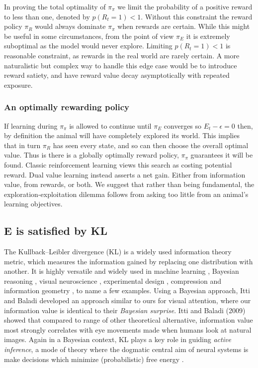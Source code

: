 \documentclass[9pt,twocolumn,twoside]{pnas-new}
\begin{document}
In proving the total optimality of $\pi_{\pi}$ we limit the probability of a positive reward to less than one, denoted by $p(R_t = 1) < 1$. Without this constraint the reward policy $\pi_R$ would always dominate $\pi_{\pi}$ when rewards are certain. While this might be useful in some circumstances, from the point of view $\pi_E$ it is extremely suboptimal as the model would never explore. Limiting $p(R_t = 1) < 1$ is reasonable constraint, as rewards in the real world are rarely certain. A more naturalistic but complex way to handle this edge case would be to introduce reward satiety, and have reward value decay asymptotically with repeated exposure. 


\subsubsection*{An optimally rewarding policy}
If learning during $\pi_{\pi}$ is allowed to continue until $\pi_E$ converges so $E_t - \epsilon = 0$ then, by definition the animal will have completely explored its world. This implies that in turn $\pi_R$ has seen every state, and so can then choose the overall optimal value. Thus is there is a globally optimally reward policy, $\pi_{\pi}$ guarantees it will be found. Classic reinforcement learning views this search as costing potential reward. Dual value learning instead asserts a net gain. Either from information value, from rewards, or both. We suggest that rather than being fundamental, the exploration-exploitation dilemma follows from asking too little from an animal's learning objectives.

\subsection*{E is satisfied by KL}
The Kullback--Leibler divergence (KL) is a widely used information theory metric, which measures the information gained by replacing one distribution with another. It is highly versatile and widely used in machine learning \cite{Goodfellow-et-al-2016}, Bayesian reasoning \cite{Itti2009,Friston2016}, visual neuroscience \cite{Itti2009}, experimental design \cite{Lopez-Fidalgo2007}, compression \cite{Mackay,Still2012} and information geometry \cite{Ay2015}, to name a few examples. Using a Bayesian approach, Itti and Baladi \citep{Itti2009} developed an approach similar to ours for visual attention, where our information value is identical to their \textit{Bayesian surprise}. Itti and Baladi (2009) showed that compared to range of other theoretical alternative, information value most strongly correlates with eye movements made when humans look at natural images. Again in a Bayesian context, KL plays a key role in guiding \textit{active inference}, a mode of theory where the dogmatic central aim of neural systems is make decisions which minimize (probabilistic) free energy \cite{Friston2016,Schwartenbeck2019}. 
\end{document}
